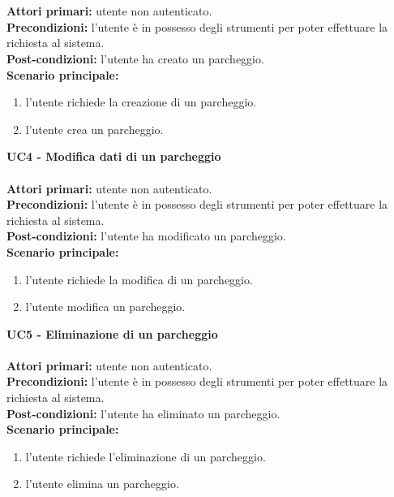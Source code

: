 \\\\
\textbf{Attori primari:} utente non autenticato.
\\
\textbf{Precondizioni:} l'utente è in possesso degli strumenti per poter effettuare la richiesta al sistema.
\\
\textbf{Post-condizioni:} l'utente ha creato un parcheggio.
\\
\textbf{Scenario principale:}
\begin{enumerate}
    \item l'utente richiede la creazione di un parcheggio.
    \item l'utente crea un parcheggio.
\end{enumerate}
\leavevmode\newline
\textbf{UC4 - Modifica dati di un parcheggio}
\\\\
\textbf{Attori primari:} utente non autenticato.
\\
\textbf{Precondizioni:} l'utente è in possesso degli strumenti per poter effettuare la richiesta al sistema.
\\
\textbf{Post-condizioni:} l'utente ha modificato un parcheggio.
\\
\textbf{Scenario principale:}
\begin{enumerate}
    \item l'utente richiede la modifica di un parcheggio.
    \item l'utente modifica un parcheggio.
\end{enumerate}
\leavevmode\newline
\textbf{UC5 - Eliminazione di un parcheggio}
\\\\
\textbf{Attori primari:} utente non autenticato.
\\
\textbf{Precondizioni:} l'utente è in possesso degli strumenti per poter effettuare la richiesta al sistema.
\\
\textbf{Post-condizioni:} l'utente ha eliminato un parcheggio.
\\
\textbf{Scenario principale:}
\begin{enumerate}
    \item l'utente richiede l'eliminazione di un parcheggio.
    \item l'utente elimina un parcheggio.
\end{enumerate}
\clearpage
\leavevmode\newline

